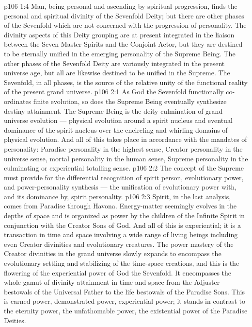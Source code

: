 \vs p106 1:4 Man, being personal and ascending by spiritual progression, finds the personal and spiritual divinity of the Sevenfold Deity; but there are other phases of the Sevenfold which are not concerned with the progression of personality. The divinity aspects of this Deity grouping are at present integrated in the liaison between the Seven Master Spirits and the Conjoint Actor, but they are destined to be eternally unified in the emerging personality of the Supreme Being. The other phases of the Sevenfold Deity are variously integrated in the present universe age, but all are likewise destined to be unified in the Supreme. The Sevenfold, in all phases, is the source of the relative unity of the functional reality of the present grand universe.
\vs p106 2:1 As God the Sevenfold functionally co\hyp{}ordinates finite evolution, so does the Supreme Being eventually synthesize destiny attainment. The Supreme Being is the deity culmination of grand universe evolution --- physical evolution around a spirit nucleus and eventual dominance of the spirit nucleus over the encircling and whirling domains of physical evolution. And all of this takes place in accordance with the mandates of personality: Paradise personality in the highest sense, Creator personality in the universe sense, mortal personality in the human sense, Supreme personality in the culminating or experiential totalling sense.
\vs p106 2:2 \pc The concept of the Supreme must provide for the differential recognition of spirit person, evolutionary power, and power\hyp{}personality synthesis --- the unification of evolutionary power with, and its dominance by, spirit personality.
\vs p106 2:3 Spirit, in the last analysis, comes from Paradise through Havona. Energy\hyp{}matter seemingly evolves in the depths of space and is organized as power by the children of the Infinite Spirit in conjunction with the Creator Sons of God. And all of this is experiential; it is a transaction in time and space involving a wide range of living beings including even Creator divinities and evolutionary creatures. The power mastery of the Creator divinities in the grand universe slowly expands to encompass the evolutionary settling and stabilizing of the time\hyp{}space creations, and this is the flowering of the experiential power of God the Sevenfold. It encompasses the whole gamut of divinity attainment in time and space from the Adjuster bestowals of the Universal Father to the life bestowals of the Paradise Sons. This is earned power, demonstrated power, experiential power; it stands in contrast to the eternity power, the unfathomable power, the existential power of the Paradise Deities.
